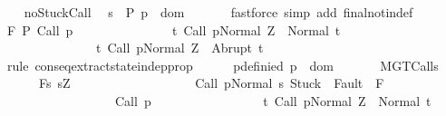 \begin{isabellebody}
\ \ \isamarkupfalse%
\ noStuck{\isacharunderscore}Call\ \isamarkupfalse%
\ {\isachardoublequoteopen}{\isasymforall}s\ {\isasymin}\ {\isacharquery}P{\isachardot}\ p\ {\isasymin}\ dom\ {\isasymGamma}{\isachardoublequoteclose}\isanewline
\ \ \ \ \isamarkupfalse%
\ {\isacharparenleft}fastforce\ simp\ add{\isacharcolon}\ final{\isacharunderscore}notin{\isacharunderscore}def\ {\isacharparenright}\isanewline
\ \ \isamarkupfalse%
\ \isamarkupfalse%
\ {\isachardoublequoteopen}{\isasymGamma}{\isacharcomma}{\isasymTheta}{\isasymturnstile}\isactrlbsub {\isacharslash}F\isactrlesub \ {\isacharquery}P\ {\isacharparenleft}Call\ p{\isacharparenright}\isanewline
\ \ \ \ \ \ \ \ \ \ \ \ \ \ \ {\isacharbraceleft}t{\isachardot}\ {\isasymGamma}{\isasymturnstile}{\isasymlangle}Call\ p{\isacharcomma}Normal\ Z{\isasymrangle}\ {\isasymRightarrow}\ Normal\ t{\isacharbraceright}{\isacharcomma}\isanewline
\ \ \ \ \ \ \ \ \ \ \ \ \ \ \ {\isacharbraceleft}t{\isachardot}\ {\isasymGamma}{\isasymturnstile}{\isasymlangle}Call\ p{\isacharcomma}Normal\ Z{\isasymrangle}\ {\isasymRightarrow}\ Abrupt\ t{\isacharbraceright}{\isachardoublequoteclose}\isanewline
\ \ \isamarkupfalse%
\ {\isacharparenleft}rule\ conseq{\isacharunderscore}extract{\isacharunderscore}state{\isacharunderscore}indep{\isacharunderscore}prop{\isacharparenright}\isanewline
\ \ \ \ \isamarkupfalse%
\ p{\isacharunderscore}definied{\isacharcolon}\ {\isachardoublequoteopen}p\ {\isasymin}\ dom\ {\isasymGamma}{\isachardoublequoteclose}\isanewline
\ \ \ \ \isamarkupfalse%
\ MGT{\isacharunderscore}Calls\ \isamarkupfalse%
\isanewline
\ \ \ \ \ \ {\isachardoublequoteopen}{\isasymGamma}{\isacharcomma}{\isasymTheta}{\isasymturnstile}\isactrlbsub {\isacharslash}F\isactrlesub {\isacharbraceleft}s{\isachardot}\ s{\isacharequal}Z\ {\isasymand}\ \isanewline
\ \ \ \ \ \ \ \ \ \ \ \ \ \ \ \ \ {\isasymGamma}{\isasymturnstile}{\isasymlangle}Call\ p{\isacharcomma}Normal\ s{\isasymrangle}\ {\isasymRightarrow}{\isasymnotin}{\isacharparenleft}{\isacharbraceleft}Stuck{\isacharbraceright}\ {\isasymunion}\ Fault\ {\isacharbackquote}\ {\isacharparenleft}{\isacharminus}F{\isacharparenright}{\isacharparenright}{\isacharbraceright}\isanewline
\ \ \ \ \ \ \ \ \ \ \ \ \ \ \ \ \ \ {\isacharparenleft}Call\ p{\isacharparenright}\isanewline
\ \ \ \ \ \ \ \ \ \ \ \ \ \ \ \ \ {\isacharbraceleft}t{\isachardot}\ {\isasymGamma}{\isasymturnstile}{\isasymlangle}Call\ p{\isacharcomma}Normal\ Z{\isasymrangle}\ {\isasymRightarrow}\ Normal\ t{\isacharbraceright}{\isacharcomma}\isanewline

\end{isabellebody}
